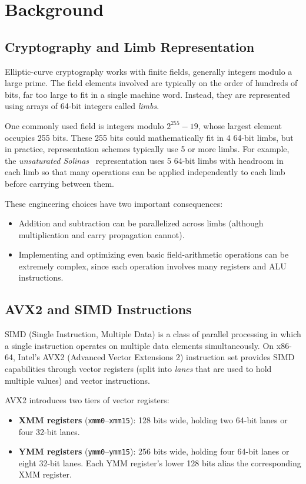 \chapter{Background}
\label{ch:background}


\section{Cryptography and Limb Representation}

Elliptic-curve cryptography works with finite fields, generally integers modulo a large prime. 
The field elements involved are typically on the order of hundreds of bits, far too large to fit in a single machine word.
Instead, they are represented using arrays of 64-bit integers called \emph{limbs}.

One commonly used field is integers modulo $2^{255}-19$, whose largest element occupies 255 bits.
These 255 bits could mathematically fit in 4 64-bit limbs, but in practice, representation schemes typically use 5 or more limbs.
For example, the \emph{unsaturated Solinas}~\autocite{fiatcrypto2019} representation uses 5 64-bit limbs with headroom in each limb so that many operations can be applied independently to each limb before carrying between them. 

These engineering choices have two important consequences: 
\begin{itemize}
    \item Addition and subtraction can be parallelized across limbs (although multiplication and carry propagation cannot).
    \item Implementing and optimizing even basic field-arithmetic operations can be extremely complex, since each operation involves many registers and ALU instructions.
\end{itemize}

\section{AVX2 and SIMD Instructions}
\label{sec:avx-background}

SIMD (Single Instruction, Multiple Data) is a class of parallel processing in which a single instruction operates on multiple data elements simultaneously.
On x86-64, Intel's AVX2 (Advanced Vector Extensions 2) instruction set provides SIMD capabilities through vector registers (split into \textit{lanes} that are used to hold multiple values) and vector instructions.

AVX2 introduces two tiers of vector registers:
\begin{itemize}
    \item \textbf{XMM registers} (\texttt{xmm0}--\texttt{xmm15}): 128 bits wide, holding two 64-bit lanes or four 32-bit lanes.
    \item \textbf{YMM registers} (\texttt{ymm0}--\texttt{ymm15}): 256 bits wide, holding four 64-bit lanes or eight 32-bit lanes. Each YMM register's lower 128 bits alias the corresponding XMM register.
\end{itemize}

